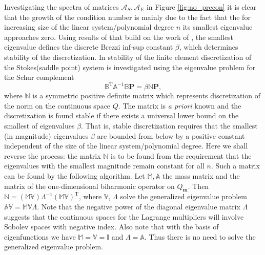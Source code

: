 \documentclass{marine_2015}
\newcommand{\Amat}{\ensuremath{\mathbb{A}}}
\newcommand{\Bmat}{\ensuremath{\mathbb{B}}}
\newcommand{\Pvec}{\ensuremath{\mathbf{P}}}
\newcommand{\Qh}{\ensuremath{Q_{\mathbf{m}}}}
\begin{document}
Investigating the spectra of matrices $\mathcal{A}_S, \mathcal{A}_E$ in Figure 
\ref{fig:no_precon} it is clear that the growth of the condition number is mainly 
due to the fact that the for increasing size of the linear
system/polynomial degree $n$ its smallest eigenvalue approaches zero. Using results of 
\cite{marie} that build on the work of \cite{malkus}, the smallest eigenvalue defines 
the discrete Brezzi inf-sup constant $\beta$, which determines stability of the discretization. In \cite{marie} 
stability of the finite element discretization of the Stokes(saddle point) system 
is investigated using the eigenvalue problem for the Schur complement
\begin{equation}
  \label{eq:schur}
  \Bmat^{\text{T}}\Amat^{-1}\Bmat\Pvec = \beta\mathbb{N}\Pvec,
\end{equation}
where $\mathbb{N}$ is a symmetric positive definite matrix which
represents discretization of the norm on the continuous space $Q$. The matrix is
\textit{a priori} known and the discretization is found stable if there exists a
universal lower bound on the smallest of eigenvalues $\beta$. That is, stable
discretization requires that the smallest (in magnitude) eigenvalues $\beta$ are bounded from
below by a positive constant independent of the size of the linear system/polynomial
degree. Here we shall reverse the process: the matrix $\mathbb{N}$ is to be found 
from the requirement that the eigenvalues with the smallest magnitude remain
constant for all $n$. Such a matrix can be found by the following algorithm. Let $\mathbb{M},
\mathbb{A}$ the mass matrix and the matrix of the one-dimensional biharmonic operator on $\Qh$.
Then
$\mathbb{N}=\left(\mathbb{M}\mathbb{V}\right){\Lambda}^{-1}\left(\mathbb{M}\mathbb{V}\right)^{\text{T}}$,
where $\mathbb{V}$, $\Lambda$ solve the generalized eigenvalue problem
$\mathbb{A}\mathbb{V}=\mathbb{M}\mathbb{V}\Lambda$. Note that the negative power 
of the diagonal eigenvalue matrix $\Lambda$ suggests that the continuous spaces 
for the Lagrange multipliers will involve Sobolev spaces with negative index.
Also note that with the basis of eigenfunctions we have $\mathbb{M}=\mathbb{V}=\mathbb{I}$
and $\Lambda=\mathbb{A}$. Thus there is no need to solve the generalized
eigenvalue problem. 
\end{document}
